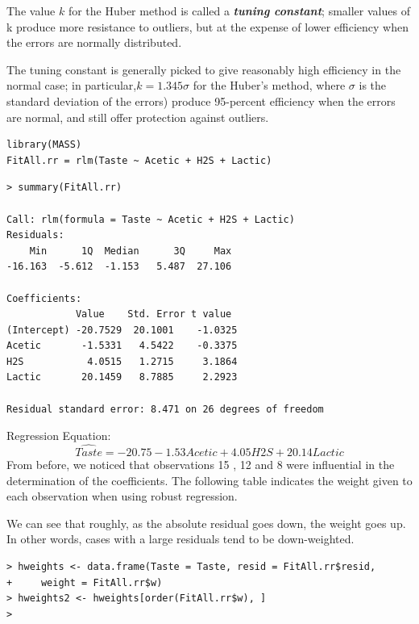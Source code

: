 \documentclass[12pt, a4paper]{article}
\theoremstyle{plain}
\theoremstyle{definition}
\theoremstyle{remark}
\begin{document}
The value $k$ for the Huber method is called a \textbf{\textit{tuning constant}}; smaller values of k produce more resistance to outliers, but at the expense of lower efficiency when the errors are normally distributed.

The tuning constant is generally picked to give reasonably high efficiency in the normal case; in particular,$ k = 1.345\sigma$ for the Huber’s method, where $\sigma$ is the standard deviation of the errors) produce 95-percent efficiency when the errors are normal, and still offer protection against outliers.


\begin{framed}
\begin{verbatim}
library(MASS)
FitAll.rr = rlm(Taste ~ Acetic + H2S + Lactic)
\end{verbatim}
\end{framed}

\begin{verbatim}
> summary(FitAll.rr)

Call: rlm(formula = Taste ~ Acetic + H2S + Lactic)
Residuals:
    Min      1Q  Median      3Q     Max 
-16.163  -5.612  -1.153   5.487  27.106 

Coefficients:
            Value    Std. Error t value 
(Intercept) -20.7529  20.1001    -1.0325
Acetic       -1.5331   4.5422    -0.3375
H2S           4.0515   1.2715     3.1864
Lactic       20.1459   8.7885     2.2923

Residual standard error: 8.471 on 26 degrees of freedom
\end{verbatim}

Regression Equation: 
\[ \hat{Taste} = -20.75 -1.53 Acetic + 4.05 H2S + 20.14 Lactic\]
From before, we noticed that observations 15 , 12 and 8 were influential in the determination of the coefficients. The following table indicates the weight given to each observation when using robust regression.  

We can see that roughly, as the absolute residual goes down, the weight goes up. In other words, cases with a large residuals tend to be down-weighted.


\begin{framed}
\begin{verbatim}
> hweights <- data.frame(Taste = Taste, resid = FitAll.rr$resid,
+     weight = FitAll.rr$w)
> hweights2 <- hweights[order(FitAll.rr$w), ]
>
\end{verbatim}
\end{framed}
\end{document}
